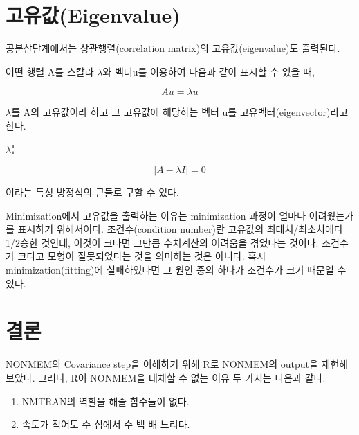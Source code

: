 \documentclass[
  11pt,
  krantz2,
  a4paper]{krantz}
\providecommand{\tightlist}{%
  \setlength{\itemsep}{0pt}\setlength{\parskip}{0pt}}
\theoremstyle{definition}
\theoremstyle{definition}
\theoremstyle{definition}
\theoremstyle{remark}
\begin{document}
\hypertarget{uxace0uxc720uxac12eigenvalue}{%
\section{고유값(Eigenvalue)}\label{uxace0uxc720uxac12eigenvalue}}


공분산단계에서는 상관행렬(correlation matrix)의 고유값(eigenvalue)도 출력된다.

어떤 행렬 A를 스칼라 \(\lambda\)와 벡터u를 이용하여 다음과 같이 표시할 수 있을 때,

\begin{equation}
Au = \lambda u
\label{eq:au-lu}
\end{equation}

\(\lambda\)를 A의 고유값이라 하고 그 고유값에 해당하는 벡터 u를 고유벡터(eigenvector)라고 한다.

\(\lambda\)는

\begin{equation}
\left| A - \lambda I \right| = 0
\label{eq:a-li-zero}
\end{equation}

이라는 특성 방정식의 근들로 구할 수 있다.

Minimization에서 고유값을 출력하는 이유는 minimization 과정이 얼마나 어려웠는가를 표시하기 위해서이다. 조건수(condition number)란 고유값의 최대치/최소치에다 1/2승한 것인데, 이것이 크다면 그만큼 수치계산의 어려움을 겪었다는 것이다. 조건수가 크다고 모형이 잘못되었다는 것을 의미하는 것은 아니다. 혹시 minimization(fitting)에 실패하였다면 그 원인 중의 하나가 조건수가 크기 때문일 수 있다.

\hypertarget{uxacb0uxb860}{%
\section{결론}\label{uxacb0uxb860}}

NONMEM의 Covariance step을 이해하기 위해 R로 NONMEM의 output을 재현해 보았다. 그러나, R이 NONMEM을 대체할 수 없는 이유 두 가지는 다음과 같다.

\begin{enumerate}
\def\labelenumi{\arabic{enumi}.}
\tightlist
\item
  NMTRAN의 역할을 해줄 함수들이 없다.
\item
  속도가 적어도 수 십에서 수 백 배 느리다.
\end{enumerate}
\end{document}
